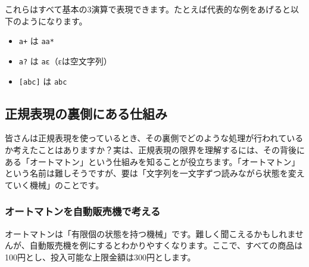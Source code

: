 これらはすべて基本の3演算で表現できます。たとえば代表的な例をあげると以下のようになります。

\begin{itemize}
\item
  \texttt{a+} は \texttt{aa*}
\item
  \texttt{a?} は \texttt{a\textbar{}ε}（εは空文字列）
\item
  \texttt{{[}abc{]}} は \texttt{a\textbar{}b\textbar{}c}
\end{itemize}

\subsection{正規表現の裏側にある仕組み}

\enlargethispage{\baselineskip}皆さんは正規表現を使っているとき、その裏側でどのような処理が行われているか考えたことはありますか？実は、正規表現の限界を理解するには、その背後にある「オートマトン」という仕組みを知ることが役立ちます。「オートマトン」という名前は難しそうですが、要は「文字列を一文字ずつ読みながら状態を変えていく機械」のことです。

\subsubsection{オートマトンを自動販売機で考える}

オートマトンは「有限個の状態を持つ機械」です。難しく聞こえるかもしれませんが、自動販売機を例にするとわかりやすくなります。ここで、すべての商品は100円とし、投入可能な上限金額は300円とします。

